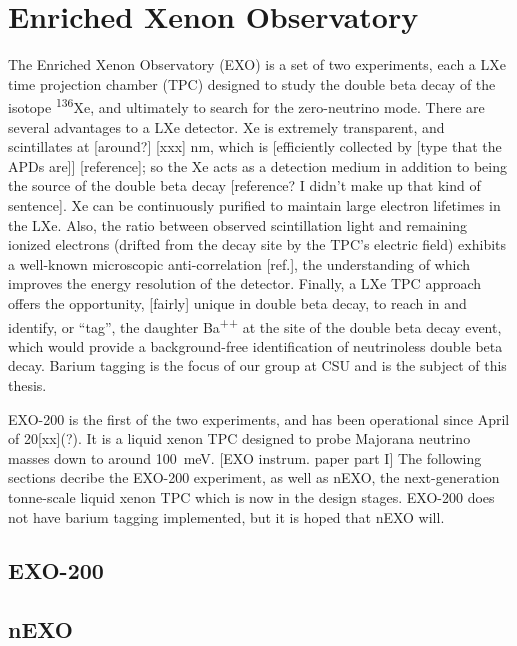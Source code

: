 \section{Enriched Xenon Observatory}

The Enriched Xenon Observatory (EXO) is a set of two experiments, each a LXe time projection chamber (TPC) designed to study the double beta decay of the isotope \textsuperscript{136}Xe, and ultimately to search for the zero-neutrino mode.  There are several advantages to a LXe detector.  Xe is extremely transparent, and scintillates at [around?] [xxx] nm, which is [efficiently collected by [type that the APDs are]] [reference]; so the Xe acts as a detection medium in addition to being the source of the double beta decay [reference? I didn't make up that kind of sentence].  Xe can be continuously purified to maintain large electron lifetimes in the LXe.  Also, the ratio between observed scintillation light and remaining ionized electrons (drifted from the decay site by the TPC's electric field) exhibits a well-known microscopic anti-correlation [ref.], the understanding of which improves the energy resolution of the detector.  Finally, a LXe TPC approach offers the opportunity, [fairly] unique in double beta decay, to reach in and identify, or ``tag'', the daughter Ba\textsuperscript{++} at the site of the double beta decay event, which would provide a background-free identification of neutrinoless double beta decay. Barium tagging is the focus of our group at CSU and is the subject of this thesis.

EXO-200 is the first of the two experiments, and has been operational since April of 20[xx](?).  It is a liquid xenon TPC designed to probe Majorana neutrino masses down to around 100~meV.  [EXO instrum. paper part I]  The following sections decribe the EXO-200 experiment, as well as nEXO, the next-generation tonne-scale liquid xenon TPC which is now in the design stages.  EXO-200 does not have barium tagging implemented, but it is hoped that nEXO will. 

\subsection{EXO-200}



\subsection{nEXO}

